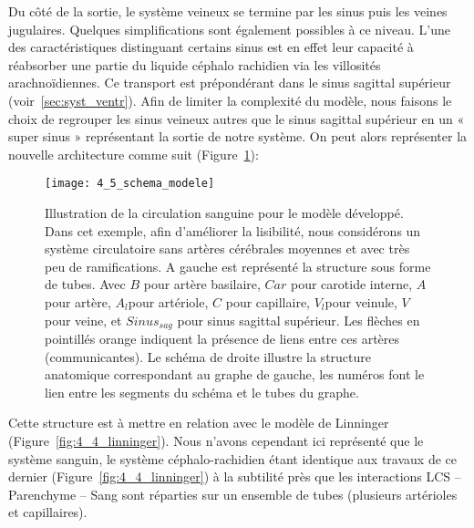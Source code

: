 Du côté de la sortie, le système veineux se termine par les sinus puis les veines jugulaires.
Quelques simplifications sont également possibles à ce niveau. L’une des caractéristiques distinguant
certains sinus est en effet leur capacité à réabsorber une partie du liquide céphalo rachidien via les
villosités arachnoïdiennes. Ce transport est prépondérant dans le sinus sagittal supérieur (voir~\ref{sec:syst_ventr}). Afin de limiter la complexité du modèle, nous faisons le choix de regrouper les sinus veineux autres
que le sinus sagittal supérieur en un « super sinus » représentant la sortie de notre système. On peut
alors représenter la nouvelle architecture comme suit (Figure~\ref{fig:4_5_schema_modele}):
\begin{figure}[!t]
\centering
\texttt{[image: 4\_5\_schema\_modele]}
\caption{Illustration de la circulation sanguine pour le modèle développé. Dans cet exemple, afin d’améliorer la lisibilité,
nous considérons un système circulatoire sans artères cérébrales moyennes et avec très peu de ramifications. A gauche est
représenté la structure sous forme de tubes. Avec $B$ pour artère basilaire, $Car$ pour carotide interne, $A$ pour artère, $A_l $pour
artériole, $C$ pour capillaire, $V_l $pour veinule, $V$ pour veine, et $Sinus_{sag}$ pour sinus sagittal supérieur. Les flèches en pointillés
orange indiquent la présence de liens entre ces artères (communicantes). Le schéma de droite illustre la structure
anatomique correspondant au graphe de gauche, les numéros font le lien entre les segments du schéma et le tubes du
graphe.
}
\label{fig:4_5_schema_modele}	
\end{figure}
Cette structure est à mettre en relation avec le modèle de Linninger (Figure~\ref{fig:4_4_linninger}). Nous n’avons
cependant ici représenté que le système sanguin, le système céphalo-rachidien étant identique aux
travaux de ce dernier (Figure~\ref{fig:4_4_linninger}) à la subtilité près que les interactions LCS – Parenchyme – Sang sont
réparties sur un ensemble de tubes (plusieurs artérioles et capillaires).

